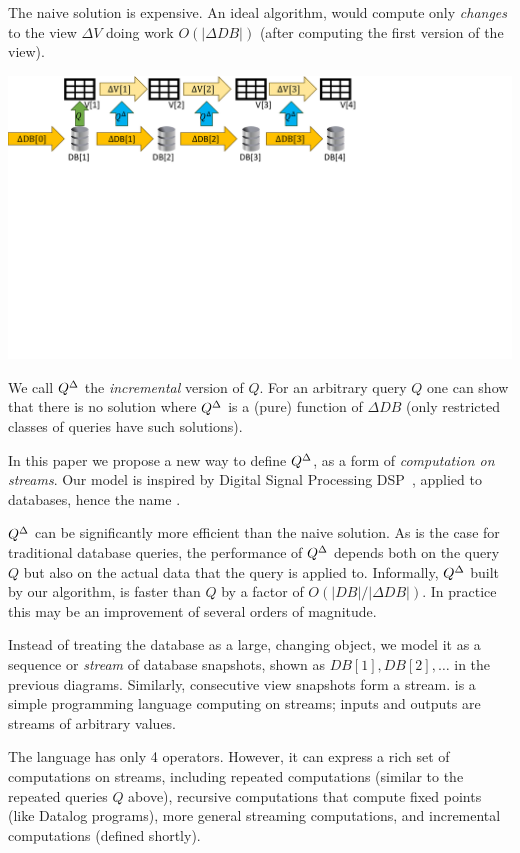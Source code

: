 The naive solution is expensive.  An ideal algorithm, would compute
only \emph{changes} to the view $\Delta V$ doing work $O(|\Delta DB|)$
(after computing the first version of the view).

\noindent \includegraphics[trim={0 5.2in 4.1in 0},clip,scale=.35]{incview.pdf}

We call ${Q}^{\Delta}$ the \emph{incremental} version of $Q$.  For an
arbitrary query $Q$ one can show that there is no solution where
${Q}^{\Delta}$ is a (pure) function of $\Delta DB$ (only restricted classes
of queries have such solutions).

In this paper we propose a new way to define ${Q}^{\Delta}$, as a form of
\emph{computation on streams}.  Our model is inspired by Digital
Signal Processing DSP~\cite{rabiner-book75}, applied to databases,
hence the name \dbsp.

${Q}^{\Delta}$ can be significantly more efficient than the naive
solution.  As is the case for traditional database queries, the
performance of ${Q}^{\Delta}$ depends both on the query $Q$ but also on the
actual data that the query is applied to.  Informally, ${Q}^{\Delta}$ built
by our algorithm, is faster than $Q$ by a factor of $O(|DB| / |\Delta
DB|)$.  In practice this may be an improvement of several orders of
magnitude.

Instead of treating the database as a large, changing object, we model
it as a sequence or \emph{stream} of database snapshots, shown as
$DB[1], DB[2], \ldots$ in the previous diagrams.  Similarly,
consecutive view snapshots form a stream.  \dbsp is a simple
programming language computing on streams; inputs and outputs are
streams of arbitrary values.

The \dbsp language has only 4 operators.  However, it can express a
rich set of computations on streams, including repeated computations
(similar to the repeated queries $Q$ above), recursive computations
that compute fixed points (like Datalog programs), more general
streaming computations, and incremental computations (defined
shortly).

